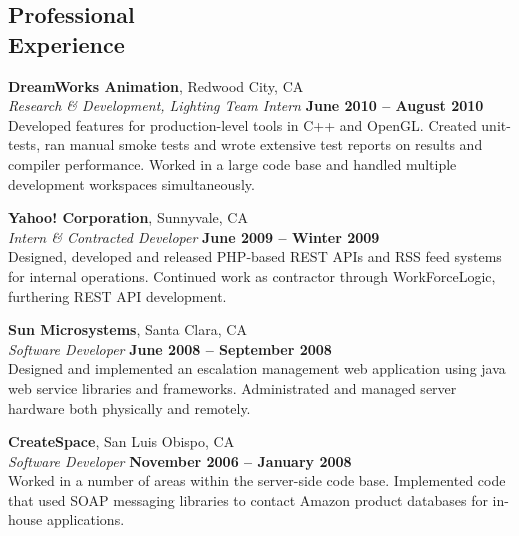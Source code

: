 \documentclass[margin,line]{resume}
\begin{document}
\begin{resume}
    \section{\mysidestyle Professional\\Experience}

    \textbf{DreamWorks Animation}, Redwood City, CA \vspace{2mm}\\\vspace{1mm}%
    \textsl{Research \& Development, Lighting Team Intern} \hfill \textbf{June 2010 -- August 2010}\\
    Developed features for production-level tools in C++ and OpenGL.
    Created unit-tests, ran manual smoke tests and wrote extensive test reports on results and compiler performance.
    Worked in a large code base and handled multiple development workspaces simultaneously.

    \textbf{Yahoo! Corporation}, Sunnyvale, CA \vspace{2mm}\\\vspace{1mm}%
    \textsl{Intern \& Contracted Developer} \hfill \textbf{June 2009 -- Winter 2009}\\
    Designed, developed and released PHP-based REST APIs and RSS feed systems for internal operations.
    Continued work as contractor through WorkForceLogic, furthering REST API development.

    \textbf{Sun Microsystems}, Santa Clara, CA \vspace{2mm}\\\vspace{1mm}%
    \textsl{Software Developer} \hfill \textbf{June 2008 -- September 2008}\\
    Designed and implemented an escalation management web application using java web service libraries and frameworks.
    Administrated and managed server hardware both physically and remotely.

    \textbf{CreateSpace}, San Luis Obispo, CA \vspace{2mm}\\\vspace{1mm}%
    \textsl{Software Developer} \hfill \textbf{November 2006 -- January 2008}\\
    Worked in a number of areas within the server-side code base.
    Implemented code that used SOAP messaging libraries to contact Amazon product databases for in-house applications.
    


\end{resume}
\end{document}
